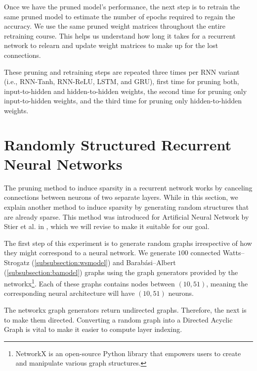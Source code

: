 Once we have the pruned model's performance, the next step is to retrain the same pruned model to estimate the number of epochs required to regain the accuracy. We use the same pruned weight matrices throughout the entire retraining course. This helps us understand how long it takes for a recurrent network to relearn and update weight matrices to make up for the lost connections.

These pruning and retraining steps are repeated three times per RNN variant (i.e., RNN-Tanh, RNN-ReLU, LSTM, and GRU), first time for pruning both, input-to-hidden and hidden-to-hidden weights, the second time for pruning only input-to-hidden weights, and the third time for pruning only hidden-to-hidden weights. 


\newpage
\section{Randomly Structured Recurrent Neural Networks}\label{section:random_rnn}

The pruning method to induce sparsity in a recurrent network works by canceling connections between neurons of two separate layers. While in this section, we explain another method to induce sparsity by generating random structures that are already sparse. This method was introduced for Artificial Neural Network by Stier et al. in \cite{julian}, which we will revise to make it suitable for our goal.

The first step of this experiment is to generate random graphs irrespective of how they might correspond to a neural network. We generate $100$ connected Watts–Strogatz (\ref{subsubsection:wsmodel}) and Barabási–Albert (\ref{subsubsection:bamodel}) graphs using the graph generators provided by the networkx\footnote{NetworkX is an open-source Python library that empowers users to create and manipulate various graph structures.}. Each of these graphs contains nodes between $(10, 51)$, meaning the corresponding neural architecture will have $(10, 51)$ neurons.

The networkx graph generators return undirected graphs. Therefore, the next is to make them directed. Converting a random graph into a Directed Acyclic Graph is vital to make it easier to compute layer indexing.

